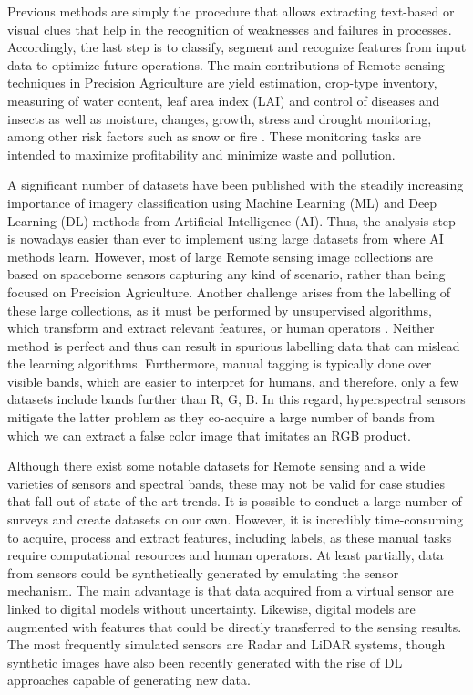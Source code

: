 Previous methods are simply the procedure that allows extracting text-based or visual clues that help in the recognition of weaknesses and failures in processes. Accordingly, the last step is to classify, segment and recognize features from input data to optimize future operations. The main contributions of \gls{Remote sensing} techniques in Precision Agriculture are  yield estimation, crop-type inventory, measuring of water content, leaf area index (LAI) and control of diseases and insects as well as moisture, changes, growth, stress and drought monitoring, among other risk factors such as snow or fire \cite{huang_agricultural_2018}. These monitoring tasks are intended to maximize profitability and minimize waste and pollution. 

A significant number of datasets have been published with the steadily increasing importance of imagery classification using Machine Learning (ML) and Deep Learning (DL) methods from Artificial Intelligence (AI). Thus, the analysis step is nowadays easier than ever to implement using large datasets from where AI methods learn. However, most of large \gls{Remote sensing} image collections are based on spaceborne sensors capturing any kind of scenario, rather than being focused on Precision Agriculture. Another challenge arises from the labelling of these large collections, as it must be performed by unsupervised algorithms, which transform and extract relevant features, or human operators \cite{li_image_2021, basu_deepsat_2015}. Neither method is perfect and thus can result in spurious labelling data that can mislead the learning algorithms. Furthermore, manual tagging is typically done over visible bands, which are easier to interpret for humans, and therefore, only a few datasets include bands further than R, G, B. In this regard, hyperspectral sensors mitigate the latter problem as they co-acquire a large number of bands from which we can extract a false color image that imitates an RGB product.

Although there exist some notable datasets for \gls{Remote sensing} and a wide varieties of sensors and spectral bands, these may not be valid for case studies that fall out of state-of-the-art trends. It is possible to conduct a large number of surveys and create datasets on our own. However, it is incredibly time-consuming to acquire, process and extract features, including labels, as these manual tasks require computational resources and human operators. At least partially, data from sensors could be synthetically generated by emulating the sensor mechanism. The main advantage is that data acquired from a virtual sensor are linked to digital models without uncertainty. Likewise, digital models are augmented with features that could be directly transferred to the sensing results. The most frequently simulated sensors are Radar and LiDAR systems, though synthetic images have also been recently generated with the rise of DL approaches capable of generating new data.  

